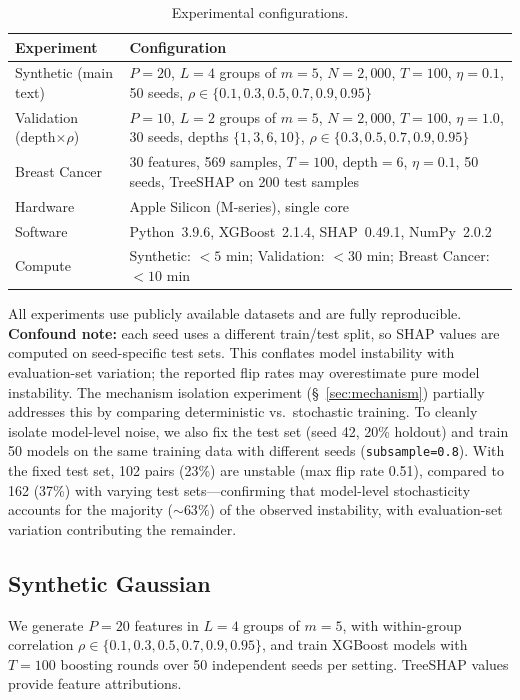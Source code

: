 \documentclass{jmlr}
\begin{document}
\begin{table}[t]
\centering
\caption{Experimental configurations.}
\small
\begin{tabular}{@{}lp{10cm}@{}}
\toprule
Experiment & Configuration \\
\midrule
Synthetic (main text) & $P{=}20$, $L{=}4$ groups of $m{=}5$, $N{=}2{,}000$, $T{=}100$, $\eta{=}0.1$, 50 seeds, $\rho \in \{0.1, 0.3, 0.5, 0.7, 0.9, 0.95\}$ \\
Validation (depth$\times\rho$) & $P{=}10$, $L{=}2$ groups of $m{=}5$, $N{=}2{,}000$, $T{=}100$, $\eta{=}1.0$, 30 seeds, depths $\{1,3,6,10\}$, $\rho \in \{0.3, 0.5, 0.7, 0.9, 0.95\}$ \\
Breast Cancer & 30 features, 569 samples, $T{=}100$, depth${=}6$, $\eta{=}0.1$, 50 seeds, TreeSHAP on 200 test samples \\
\midrule
Hardware & Apple Silicon (M-series), single core \\
Software & Python~3.9.6, XGBoost~2.1.4, SHAP~0.49.1, NumPy~2.0.2 \\
Compute & Synthetic: ${<}5$ min; Validation: ${<}30$ min; Breast Cancer: ${<}10$ min \\
\bottomrule
\end{tabular}
\end{table}

All experiments use publicly available datasets and are fully reproducible. \textbf{Confound note:} each seed uses a different train/test split, so SHAP values are computed on seed-specific test sets. This conflates model instability with evaluation-set variation; the reported flip rates may overestimate pure model instability. The mechanism isolation experiment (\S~\ref{sec:mechanism}) partially addresses this by comparing deterministic vs.\ stochastic training. To cleanly isolate model-level noise, we also fix the test set (seed 42, 20\% holdout) and train 50 models on the same training data with different seeds (\texttt{subsample=0.8}). With the fixed test set, 102 pairs (23\%) are unstable (max flip rate 0.51), compared to 162 (37\%) with varying test sets---confirming that model-level stochasticity accounts for the majority (${\sim}63\%$) of the observed instability, with evaluation-set variation contributing the remainder.

\subsection{Synthetic Gaussian}

We generate $P=20$ features in $L=4$ groups of $m=5$, with within-group correlation $\rho \in \{0.1, 0.3, 0.5, 0.7, 0.9, 0.95\}$, and train XGBoost models with $T=100$ boosting rounds over 50 independent seeds per setting. TreeSHAP values provide feature attributions.
\end{document}
